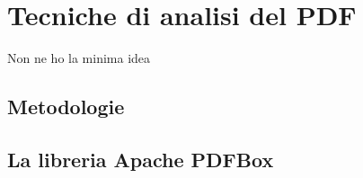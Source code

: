 \chapter{Tecniche di analisi del PDF}
Non ne ho la minima idea
\section{Metodologie}
\section{La libreria Apache PDFBox}
